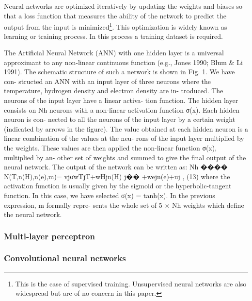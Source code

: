 Neural networks are optimized iteratively by updating the weights and biases so that 
a loss function that measures the ability of the network to predict the output from the input 
is minimized\footnote{This is the case of supervised training. Unsupervised neural networks
are also widespread but are of no concern in this paper.}. This optimization is widely known as 
learning or training process. In this process a training dataset is required.

The Artificial Neural Network (ANN) with one hidden layer is a universal approximant to any non-linear continuous function (e.g., Jones 1990; Blum \& Li 1991). The schematic structure of such a network is shown in Fig. 1. We have con- structed an ANN with an input layer of three neurons where the temperature, hydrogen density and electron density are in- troduced. The neurons of the input layer have a linear activa- tion function. The hidden layer consists on Nh neurons with a non-linear activation function σ(x). Each hidden neuron is con- nected to all the neurons of the input layer by a certain weight (indicated by arrows in the figure). The value obtained at each hidden neuron is a linear combination of the values at the neu- rons of the input layer multiplied by the weights. These values are then applied the non-linear function σ(x), multiplied by an- other set of weights and summed to give the final output of the neural network. The output of the network can be written as:
Nh ����
N(T,n(H),n(e),m)= vjσwTjT+wHjn(H) j��
+wejn(e)+uj , (13)
where the activation function is usually given by the sigmoid or the hyperbolic-tangent function. In this case, we have selected σ(x) = tanh(x). In the previous expression, m formally repre- sents the whole set of 5 × Nh weights which define the neural network.
\subsubsection{Multi-layer perceptron}
\subsubsection{Convolutional neural networks}


